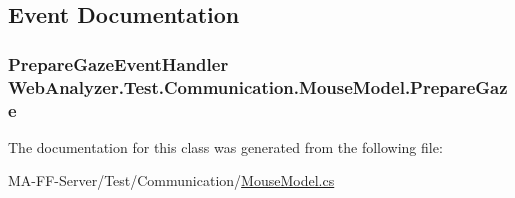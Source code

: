 \subsection{Event Documentation}
\hypertarget{class_web_analyzer_1_1_test_1_1_communication_1_1_mouse_model_ad799e6cf6032401ee7d8b1706d7c8a20}{}
\subsubsection[{Prepare\+Gaze}]{\setlength{\rightskip}{0pt plus 5cm}Prepare\+Gaze\+Event\+Handler Web\+Analyzer.\+Test.\+Communication.\+Mouse\+Model.\+Prepare\+Gaze}\label{class_web_analyzer_1_1_test_1_1_communication_1_1_mouse_model_ad799e6cf6032401ee7d8b1706d7c8a20}


The documentation for this class was generated from the following file\+:\begin{DoxyCompactItemize}
\item 
M\+A-\/\+F\+F-\/\+Server/\+Test/\+Communication/\hyperlink{_mouse_model_8cs}{Mouse\+Model.\+cs}\end{DoxyCompactItemize}
